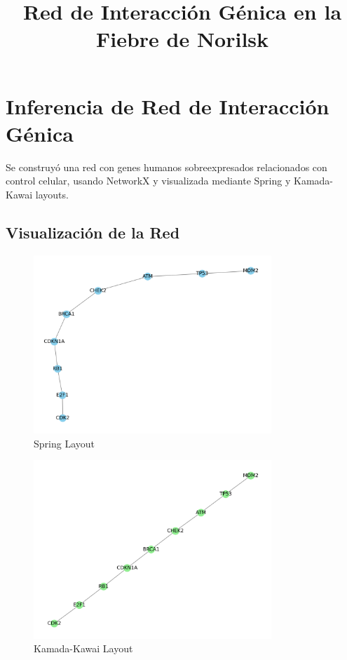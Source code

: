 \documentclass[12pt]{article}
\title{Red de Interacción Génica en la Fiebre de Norilsk}
\author{}
\date{}
\begin{document}
\maketitle

\section*{Inferencia de Red de Interacción Génica}
Se construyó una red con genes humanos sobreexpresados relacionados con control celular, usando NetworkX y visualizada mediante Spring y Kamada-Kawai layouts.

\subsection*{Visualización de la Red}
\begin{figure}[h]
\centering
\includegraphics[width=0.8\textwidth]{red_spring_layout.png}
\caption{Spring Layout}
\end{figure}

\begin{figure}[h]
\centering
\includegraphics[width=0.8\textwidth]{red_kamada_layout.png}
\caption{Kamada-Kawai Layout}
\end{figure}
\end{document}
